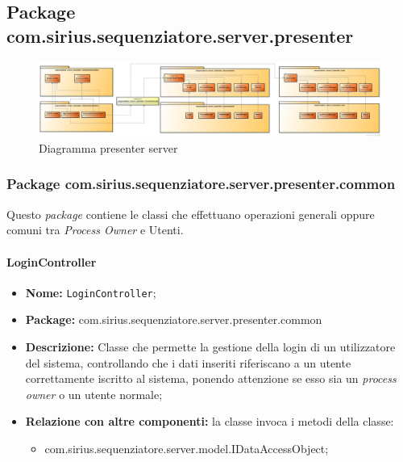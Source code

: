 \subsection{Package com.sirius.sequenziatore.server.presenter}
\begin{figure}[H] \centering \includegraphics[width=%
\textwidth]
{./pack/ClassiServerSoloPresenter.png} \caption{Diagramma presenter server}
\end{figure}
\subsubsection{Package com.sirius.sequenziatore.server.presenter.common}
Questo \textit{package} contiene le classi che effettuano operazioni generali oppure comuni tra \textit{Process Owner} e Utenti.
\paragraph{LoginController}
	\begin{itemize}
		\item \textbf{Nome:} \texttt{LoginController};
		\item \textbf{Package:} com.sirius.sequenziatore.server.presenter.common
		\item \textbf{Descrizione:} Classe che permette la gestione della login di un utilizzatore del sistema, controllando che i dati inseriti riferiscano a un utente correttamente iscritto al sistema, ponendo attenzione se esso sia un \textit{process owner} o un utente normale;
		\item \textbf{Relazione con altre componenti:} la classe invoca i metodi della classe:
		\begin{itemize}
			\item com.sirius.sequenziatore.server.model.IDataAccessObject;
		\end{itemize}
	\end{itemize}
	
